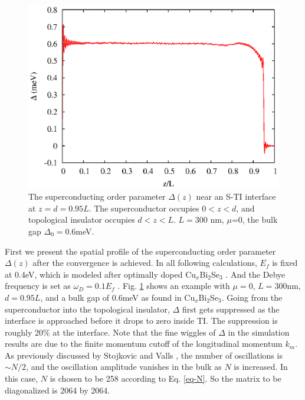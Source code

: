 \begin{figure}
\center
\includegraphics[width=\textwidth]{include/delta-cu.eps}
\caption{The superconducting order parameter $\Delta(z)$ near an S-TI interface at $
z=d=0.95L$. The superconductor occupies $0<z<d$, and topological insulator occupies $d<z<L$. 
$L=300$ nm, $\mu$=0, the bulk gap $\Delta_0=$0.6meV. }\label{delta-cu}
\end{figure}

First we present the spatial profile of the superconducting order parameter $\Delta(z)$
after the convergence is achieved. In all following calculations, $E_f$ is fixed at 0.4eV, 
which is modeled after optimally doped Cu$_x$Bi$_2$Se$_3$ \cite{cu2}. And the Debye frequency
is set as $\omega_D=0.1E_f$ \cite{h-v}.
%
Fig. \ref{delta-cu} shows an example with $\mu=0$, $L=300$nm, $d=0.95L$, and
a bulk gap of 0.6meV as found in Cu$_x$Bi$_2$Se$_3$. 
%
Going from the superconductor into the topological insulator,
$\Delta$ first gets suppressed as the interface is approached before it
drops to zero inside TI. The suppression is roughly 20\% at the interface.
Note that the fine wiggles of $\Delta$ in the simulation results 
are due to the finite momentum cutoff of 
the longitudinal momentum $k_m$. As previously discussed by 
Stojkovic and Valls \cite{s-v}, the number of oscillations is $\sim N/2$, and the 
oscillation amplitude vanishes in the bulk as $N$ is increased. 
In this case, $N$ is chosen to be
258 according to Eq. \eqref{eq-N}. So the matrix to be diagonalized is 2064 by 2064.

